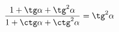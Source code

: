 \begin{ex}[type=prove_identity]
	\begin{condition}
		\( \dfrac{1+\tg\alpha+\tg^2\alpha}{1+\ctg\alpha+\ctg^2\alpha}=\tg^2\alpha \)
	\end{condition}
\end{ex}